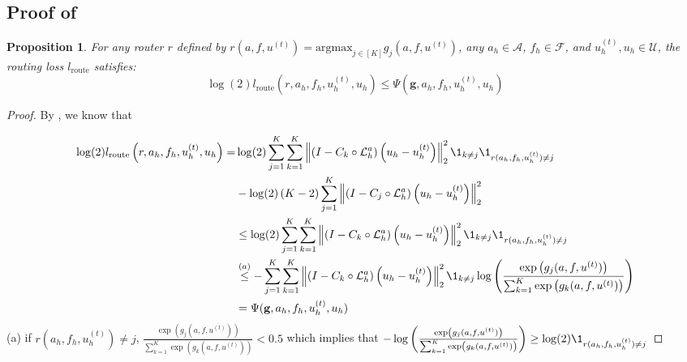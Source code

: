 \documentclass{article} %
\newtheorem{proposition}[theorem]{Proposition}
\begin{document}
\subsection{Proof of } \label{sec:proofupperbound}

\begin{proposition} \label{th:upperbound}
    For any router $r$ defined by $r(a, f, u^{(t)}) = \text{argmax}_{j \in [K]} g_j(a, f, u^{(t)})$, any $a_h \in \mathcal{A}$, $f_h \in \mathcal{F}$, and $u_h^{(t)}, u_h \in \mathcal{U}$, the routing loss $l_{\text{route}}$ satisfies:
    $$\log(2)l_{\text{route}}\left(r, a_h, f_h, u^{(t)}_h, u_h\right)\leq \Psi(\mathbf{g}, a_h, f_h, u_h^{(t)}, u_h) $$
\end{proposition}


\begin{proof}

By , we know that

\begin{align*}
    \log(2)l_{\text{route}}\left(r, a_h, f_h, u^{(t)}_h, u_h\right) = &\log(2)\sum_{j = 1}^K \sum_{k = 1}^K\left\|\left( I - C_{k} \circ \mathcal{L}_{h}^a\right)\left(u_h - u^{(t)}_h\right)\right\|^2_2\1_{k\neq j}\1_{r(a_h, f_h, u^{(t)}_h) \neq j} \\
     &-\log(2)\left(K - 2\right)\sum_{j = 1}^K\left\|\left( I - C_{j} \circ \mathcal{L}_{h}^a\right)\left(u_h - u^{(t)}_h\right)\right\|^2_2 \\
     &\leq \log(2)\sum_{j = 1}^K \sum_{k = 1}^K\left\|\left( I - C_{k} \circ \mathcal{L}_{h}^a\right)\left(u_h - u^{(t)}_h\right)\right\|^2_2\1_{k\neq j}\1_{r(a_h, f_h, u^{(t)}_h) \neq j} \\
     &\overset{(a)}{\leq} -\sum_{j = 1}^K \sum_{k = 1}^K\left\|\left( I - C_{k} \circ \mathcal{L}_{h}^a\right)\left(u_h - u^{(t)}_h\right)\right\|^2_2\1_{k\neq j}\log\left(\frac{\exp\left(g_j(a, f, u^{(t)})\right)}{\sum_{k = 1}^K\exp\left(g_k(a, f, u^{(t)})\right)}\right) \\
     &= \Psi(\mathbf{g}, a_h, f_h, u_h^{(t)}, u_h)
\end{align*}
(a) if $r(a_h, f_h, u^{(t)}_h) \neq j$, $\frac{\exp\left(g_j(a, f, u^{(t)})\right)}{\sum_{k = 1}^K\exp\left(g_k(a, f, u^{(t)})\right)} < 0.5$ which implies that $-\log\left(\frac{\exp\left(g_j(a, f, u^{(t)})\right)}{\sum_{k = 1}^K\exp\left(g_k(a, f, u^{(t)})\right)}\right)  \geq \log(2)\1_{r(a_h, f_h, u^{(t)}_h) \neq j}$

\end{proof}
\end{document}
